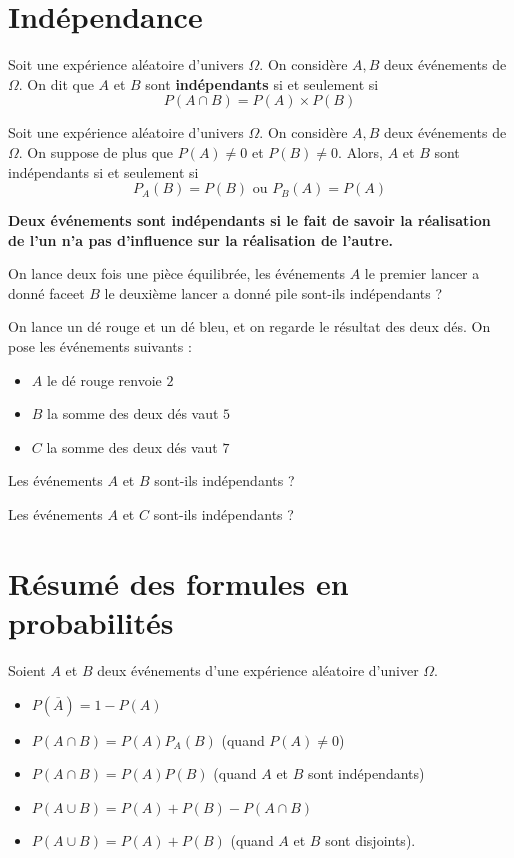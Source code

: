 \documentclass{poly}
\begin{document}
\section{Indépendance}
\begin{definition}
Soit une expérience aléatoire d'univers $\Omega$. On considère $A, B$ deux événements de $\Omega$. On dit que $A$ et $B$ sont \textbf{indépendants} si et seulement si
\begin{equation*}
P(A \cap B) = P(A) \times P(B)
\end{equation*}
\end{definition}
\begin{proposition}
Soit une expérience aléatoire d'univers $\Omega$. On considère $A, B$ deux événements de $\Omega$. On suppose de plus que $P(A) \neq 0$ et $P(B) \neq 0$. Alors, $A$ et $B$ sont indépendants si et seulement si
\begin{equation*}
P_A(B) = P(B) \text{ ou } P_B(A)=P(A)
\end{equation*}
\end{proposition}
\begin{remark}
\textbf{Deux événements sont indépendants si le fait de savoir la réalisation de l'un n'a pas d'influence sur la réalisation de l'autre.} 
\end{remark}
\begin{example}
On lance deux fois une pièce équilibrée, les événements $A$ \og le premier lancer a donné face\fg et $B$ \og le deuxième lancer a donné pile \fg sont-ils indépendants ?

On lance un dé rouge et un dé bleu, et on regarde le résultat des deux dés. On pose les événements suivants :
\begin{itemize}
\item $A$ \og le dé rouge renvoie $2$ \fg
\item $B$ \og la somme des deux dés vaut $5$ \fg
\item $C$ \og la somme des deux dés vaut $7$ \fg
\end{itemize}
\begin{alphaquestions}
\item Les événements $A$ et $B$ sont-ils indépendants ?
\item Les événements $A$ et $C$ sont-ils indépendants ?
\end{alphaquestions}

\end{example}
\section{Résumé des formules en probabilités}
Soient $A$ et $B$ deux événements d'une expérience aléatoire d'univer $\Omega$.
\begin{itemize}
\item $P(\overbar{A}) = 1 - P(A)$
\item $P(A \cap B) = P(A)P_A(B)$ (quand $P(A) \neq 0$)
\item $P(A \cap B) = P(A)P(B)$ (quand $A$ et $B$ sont indépendants)
\item $P(A \cup B) = P(A) + P(B) - P(A \cap B)$
\item $P(A \cup B) = P(A) + P(B)$ (quand $A$ et $B$ sont disjoints).
\end{itemize}
\end{document}
